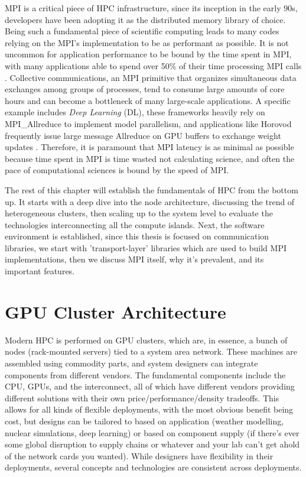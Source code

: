 MPI is a critical piece of HPC infrastructure, since its inception in the early 90s, developers have been adopting it as the distributed memory library of choice.
Being such a fundamental piece of scientific computing leads to many codes relying on the MPI's implementation to be as performant as possible.  
It is not uncommon for application performance to be bound by the time spent in MPI, with many applications able to spend over 50\% of their time processing MPI calls \cite{Chunduri2018CharacterizeMPIonProd}.
Collective communications, an MPI primitive that organizes simultaneous data exchanges among groups of processes, tend to consume large amounts of core hours and can become a bottleneck of many large-scale applications.
A specific example includes \textit{Deep Learning} (DL), these frameworks heavily rely on MPI\_Allreduce to implement model parallelism, and applications like Horovod frequently issue large message Allreduce on GPU buffers to exchange weight updates \cite{Awan2019CommProfDLonClusters, Jain2019PerfCharDNNTFPT, Alizadeh2022PAPCollDL}.
Therefore, it is paramount that MPI latency is as minimal as possible because time spent in MPI is time wasted not calculating science, and often the pace of computational sciences is bound by the speed of MPI.

The rest of this chapter will establish the fundamentals of HPC from the bottom up.
It starts with a deep dive into the node architecture, discussing the trend of heterogeneous clusters, then scaling up to the system level to evaluate the technologies interconnecting all the compute islands.
Next, the software environment is established, since this thesis is focused on communication libraries, we start with 'transport-layer' libraries which are used to build MPI implementations, then we discuss MPI itself, why it's prevalent, and its important features. %

\section{GPU Cluster Architecture}
Modern HPC is performed on GPU clusters, which are, in essence, a bunch of nodes (rack-mounted servers) tied to a system area network.
These machines are assembled using commodity parts, and system designers can integrate components from different vendors.
The fundamental components include the CPU, GPUs, and the interconnect, all of which have different vendors providing different solutions with their own price/performance/density tradeoffs.
This allows for all kinds of flexible deployments, with the most obvious benefit being cost, but designs can be tailored to based on application (weather modelling, nuclear simulations, deep learning) or based on component supply (if there's ever some global disruption to supply chains or whatever and your lab can't get ahold of the network cards you wanted).
While designers have flexibility in their deployments, several concepts and technologies  are consistent across deployments.

